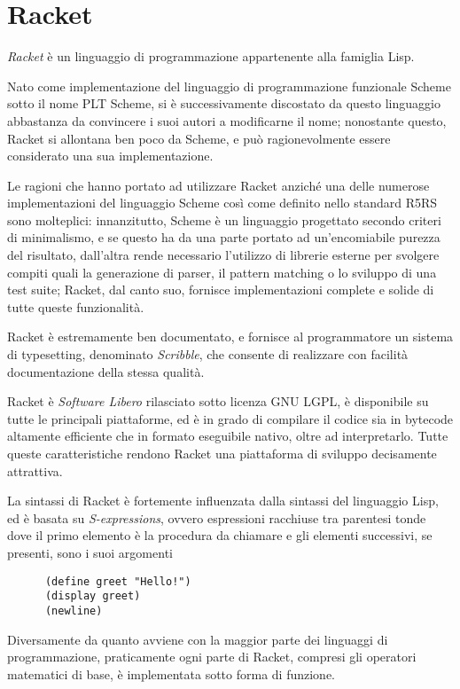 \section{Racket}

\emph{Racket} \`e un linguaggio di programmazione appartenente alla
famiglia Lisp.

Nato come implementazione del linguaggio di programmazione funzionale Scheme
sotto il nome PLT Scheme, si \`e successivamente discostato da questo
linguaggio abbastanza da convincere i suoi autori a modificarne il nome;
nonostante questo, Racket si allontana ben poco da Scheme, e pu\`o
ragionevolmente essere considerato una sua implementazione.

Le ragioni che hanno portato ad utilizzare Racket anzich\'e una delle
numerose implementazioni del linguaggio Scheme cos\`i come definito nello
standard R5RS sono molteplici: innanzitutto, Scheme \`e un linguaggio
progettato secondo criteri di minimalismo, e se questo ha da una parte
portato ad un'encomiabile purezza del risultato, dall'altra rende necessario
l'utilizzo di librerie esterne per svolgere compiti quali la generazione di
parser, il pattern matching o lo sviluppo di una test suite; Racket, dal
canto suo, fornisce implementazioni complete e solide di tutte queste
funzionalit\`a.

Racket \`e estremamente ben documentato, e fornisce al programmatore un
sistema di typesetting, denominato \emph{Scribble}, che consente di
realizzare con facilit\`a documentazione della stessa qualit\`a.

Racket \`e \emph{Software Libero} rilasciato sotto licenza GNU LGPL, \`e
disponibile su tutte le principali piattaforme, ed \`e in grado di compilare
il codice sia in bytecode altamente efficiente che in formato eseguibile
nativo, oltre ad interpretarlo. Tutte queste caratteristiche rendono Racket
una piattaforma di sviluppo decisamente attrattiva.

La sintassi di Racket \`e fortemente influenzata dalla sintassi del
linguaggio Lisp, ed \`e basata su \emph{S-expressions}, ovvero espressioni
racchiuse tra parentesi tonde dove il primo elemento \`e la procedura
da chiamare e gli elementi successivi, se presenti, sono i suoi argomenti

\begin{lstlisting}
      (define greet "Hello!")
      (display greet)
      (newline)
\end{lstlisting}

Diversamente da quanto avviene con la maggior parte dei linguaggi di
programmazione, praticamente ogni parte di Racket, compresi gli operatori
matematici di base, \`e implementata sotto forma di funzione.

